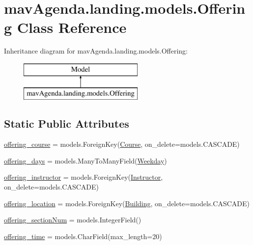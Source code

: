 \hypertarget{classmavAgenda_1_1landing_1_1models_1_1Offering}{}\section{mav\+Agenda.\+landing.\+models.\+Offering Class Reference}
\label{classmavAgenda_1_1landing_1_1models_1_1Offering}
Inheritance diagram for mav\+Agenda.\+landing.\+models.\+Offering\+:\begin{figure}[H]
\begin{center}
\leavevmode
\includegraphics[height=2.000000cm]{classmavAgenda_1_1landing_1_1models_1_1Offering}
\end{center}
\end{figure}
\subsection*{Static Public Attributes}
\begin{DoxyCompactItemize}
\item 
\mbox{\hyperlink{classmavAgenda_1_1landing_1_1models_1_1Offering_a5bc0a7b2c9fdc892d7b2a1150db5ab0e}{offering\+\_\+course}} = models.\+Foreign\+Key(\mbox{\hyperlink{classmavAgenda_1_1landing_1_1models_1_1Course}{Course}}, on\+\_\+delete=models.\+C\+A\+S\+C\+A\+DE)
\item 
\mbox{\hyperlink{classmavAgenda_1_1landing_1_1models_1_1Offering_ae73b33d9b47f9afc6c24bb2f64cdbb65}{offering\+\_\+days}} = models.\+Many\+To\+Many\+Field(\mbox{\hyperlink{classmavAgenda_1_1landing_1_1models_1_1Weekday}{Weekday}})
\item 
\mbox{\hyperlink{classmavAgenda_1_1landing_1_1models_1_1Offering_acfcb59c9b41a8f86bfab07d2b61c7930}{offering\+\_\+instructor}} = models.\+Foreign\+Key(\mbox{\hyperlink{classmavAgenda_1_1landing_1_1models_1_1Instructor}{Instructor}}, on\+\_\+delete=models.\+C\+A\+S\+C\+A\+DE)
\item 
\mbox{\hyperlink{classmavAgenda_1_1landing_1_1models_1_1Offering_a9aed58e7fc7aa3e45cc904c544ee93c7}{offering\+\_\+location}} = models.\+Foreign\+Key(\mbox{\hyperlink{classmavAgenda_1_1landing_1_1models_1_1Building}{Building}}, on\+\_\+delete=models.\+C\+A\+S\+C\+A\+DE)
\item 
\mbox{\hyperlink{classmavAgenda_1_1landing_1_1models_1_1Offering_a6f2544bb41a458d2b500c6878428bed1}{offering\+\_\+section\+Num}} = models.\+Integer\+Field()
\item 
\mbox{\hyperlink{classmavAgenda_1_1landing_1_1models_1_1Offering_ab39dc674156698916244ba97ad8c3ba1}{offering\+\_\+time}} = models.\+Char\+Field(max\+\_\+length=20)
\end{DoxyCompactItemize}


